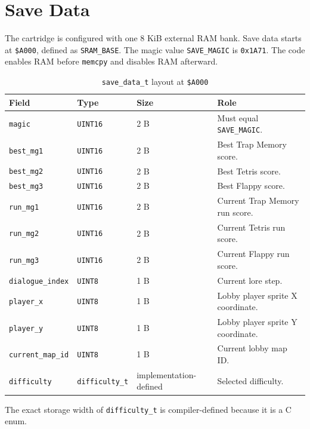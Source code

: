 \section{Save Data}

The cartridge is configured with one 8 KiB external RAM bank. Save data starts at \texttt{\$A000}, defined as \texttt{SRAM\_BASE}. The magic value \texttt{SAVE\_MAGIC} is \texttt{0x1A71}. The code enables RAM before \texttt{memcpy} and disables RAM afterward.

\begin{table}[h]
\centering
\small
\begin{tabular}{p{3.0cm}p{2.5cm}p{2.2cm}p{5.5cm}}
\toprule
\textbf{Field} & \textbf{Type} & \textbf{Size} & \textbf{Role} \\
\midrule
\texttt{magic} & \texttt{UINT16} & 2 B & Must equal \texttt{SAVE\_MAGIC}. \\
\texttt{best\_mg1} & \texttt{UINT16} & 2 B & Best Trap Memory score. \\
\texttt{best\_mg2} & \texttt{UINT16} & 2 B & Best Tetris score. \\
\texttt{best\_mg3} & \texttt{UINT16} & 2 B & Best Flappy score. \\
\texttt{run\_mg1} & \texttt{UINT16} & 2 B & Current Trap Memory run score. \\
\texttt{run\_mg2} & \texttt{UINT16} & 2 B & Current Tetris run score. \\
\texttt{run\_mg3} & \texttt{UINT16} & 2 B & Current Flappy run score. \\
\texttt{dialogue\_index} & \texttt{UINT8} & 1 B & Current lore step. \\
\texttt{player\_x} & \texttt{UINT8} & 1 B & Lobby player sprite X coordinate. \\
\texttt{player\_y} & \texttt{UINT8} & 1 B & Lobby player sprite Y coordinate. \\
\texttt{current\_map\_id} & \texttt{UINT8} & 1 B & Current lobby map ID. \\
\texttt{difficulty} & \texttt{difficulty\_t} & implementation-defined & Selected difficulty. \\
\bottomrule
\end{tabular}
\caption{\texttt{save\_data\_t} layout at \texttt{\$A000}}
\end{table}

The exact storage width of \texttt{difficulty\_t} is compiler-defined because it is a C enum.
